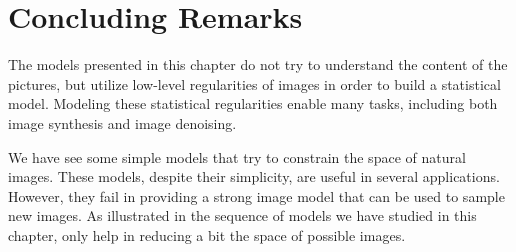 

%







%
%

%
%
%
%
%
%
%
%
\section{Concluding Remarks}

The models presented in this chapter do not try to understand the content of the pictures, but utilize low-level regularities of images in order to build a statistical model.  Modeling these statistical regularities enable many tasks, including both image synthesis and image denoising.

We have see some simple models that try to constrain the space of natural images. These models, despite their simplicity, are useful in several applications. However, they fail in providing a strong image model that can be used to sample new images. As illustrated in \fig{\ref{fig:spaces_real_images_final}} the sequence of models we have studied in this chapter, only help in reducing a bit the space of possible images.


